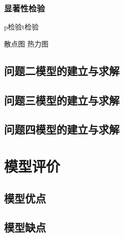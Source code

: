 \documentclass[withoutpreface,bwprint]{cumcmthesis} %
\begin{document}
\subsubsection{显著性检验}

p检验t检验

散点图 热力图








\subsection{问题二模型的建立与求解}

\subsection{问题三模型的建立与求解}

\subsection{问题四模型的建立与求解}

\section{模型评价}
\subsection{模型优点}

\subsection{模型缺点}




\begin{appendices}
\end{appendices}
\end{document}
